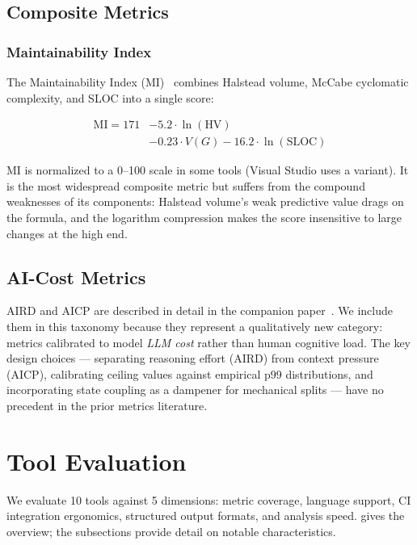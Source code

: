 \documentclass[10pt,twocolumn,letterpaper]{article}
\begin{document}
\subsection{Composite Metrics}

\subsubsection{Maintainability Index}

The Maintainability Index (MI)~\cite{mi} combines Halstead volume, McCabe
cyclomatic complexity, and SLOC into a single score:

\begin{align}
\text{MI} = 171 &- 5.2 \cdot \ln(\text{HV}) \nonumber \\
             &- 0.23 \cdot V(G) - 16.2 \cdot \ln(\text{SLOC})
\end{align}

MI is normalized to a 0--100 scale in some tools (Visual Studio uses a
variant).  It is the most widespread composite metric but suffers from the
compound weaknesses of its components: Halstead volume's weak predictive
value drags on the formula, and the logarithm compression makes the score
insensitive to large changes at the high end.

\subsection{AI-Cost Metrics}

AIRD and AICP are described in detail in the companion
paper~\cite{knots-aird}.  We include them in this taxonomy because they
represent a qualitatively new category: metrics calibrated to model
\emph{LLM cost} rather than human cognitive load.  The key design choices
--- separating reasoning effort (AIRD) from context pressure (AICP),
calibrating ceiling values against empirical p99 distributions, and
incorporating state coupling as a dampener for mechanical splits --- have
no precedent in the prior metrics literature.

\section{Tool Evaluation}
\label{sec:tools}

We evaluate 10 tools against 5 dimensions: metric coverage,
language support, CI integration ergonomics, structured output formats,
and analysis speed.   gives the overview; the subsections
provide detail on notable characteristics.
\end{document}
